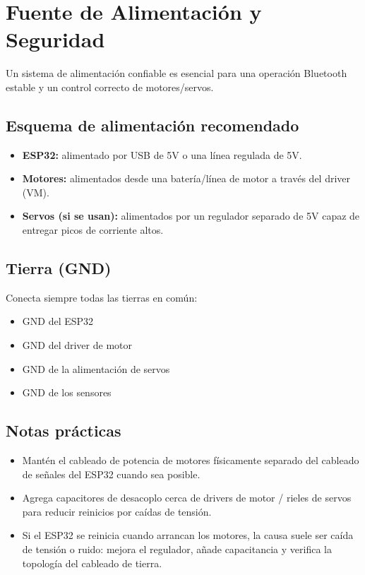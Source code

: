 \section{Fuente de Alimentación y Seguridad}
\label{sec:hw-power}

Un sistema de alimentación confiable es esencial para una operación Bluetooth estable y un control correcto de motores/servos.

\subsection{Esquema de alimentación recomendado}
\begin{itemize}
    \item \textbf{ESP32:} alimentado por USB de 5V o una línea regulada de 5V.
    \item \textbf{Motores:} alimentados desde una batería/línea de motor a través del driver (VM).
    \item \textbf{Servos (si se usan):} alimentados por un regulador separado de 5V capaz de entregar picos de corriente altos.
\end{itemize}

\subsection{Tierra (GND)}
Conecta siempre todas las tierras en común:
\begin{itemize}
    \item GND del ESP32
    \item GND del driver de motor
    \item GND de la alimentación de servos
    \item GND de los sensores
\end{itemize}

\subsection{Notas prácticas}
\begin{itemize}
    \item Mantén el cableado de potencia de motores físicamente separado del cableado de señales del ESP32 cuando sea posible.
    \item Agrega capacitores de desacoplo cerca de drivers de motor / rieles de servos para reducir reinicios por caídas de tensión.
    \item Si el ESP32 se reinicia cuando arrancan los motores, la causa suele ser caída de tensión o ruido: mejora el regulador,
    añade capacitancia y verifica la topología del cableado de tierra.
\end{itemize}